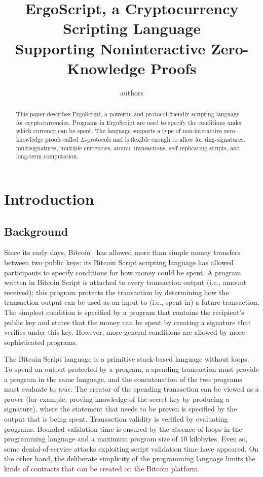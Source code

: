 \documentclass[11pt]{article}
\newcommand{\authnote}[2]{\marginpar{\parbox{\marginparwidth}{\tiny %
  \textsf{#1 {\textcolor{blue}{notes: #2}}}}}%
  \textcolor{blue}{\textbf{\dag}}}
\newcommand{\authnote}[2]{
  \textsf{#1 \textcolor{blue}{: #2}}}
\newcommand{\authnote}[2]{}
\newcommand{\lnote}[1]{{\authnote{\textcolor{orange}{Leo notes}}{#1}}}
\newcommand{\knote}[1]{{\authnote{\textcolor{green}{kushti notes}}{#1}}}
\newcommand{\langname}{ErgoScript\xspace}
\begin{document}
\title{\langname, a Cryptocurrency Scripting Language\\Supporting Noninteractive Zero-Knowledge Proofs}

\author{authors}


\maketitle


\begin{abstract}
This paper describes \langname, a powerful and protocol-friendly scripting language for cryptocurrencies. Programs in \langname are used to specify the conditions under which currency can be spent. The language supports a type of non-interactive zero-knowledge proofs called $\Sigma$-protocols and is flexible enough to allow for ring-signatures, multisignatures, multiple currencies, atomic transactions, self-replicating scripts, and long-term computation. \lnote{this list of features could use some improvement}
\end{abstract}



\section{Introduction}
\subsection{Background}

Since its early days, Bitcoin~\cite{Nak08} has allowed more than simple money transfers between two public keys: its Bitcoin Script scripting language has allowed participants to specify conditions for how money could be spent. A program written in Bitcoin Script is attached to every transaction output (i.e., amount received); this program protects the transaction by determining how the transaction output can be used as an input to (i.e., spent in) a future transaction. The simplest condition is specified by a program that contains the recipient's public key and states that the money can be spent by creating a signature that verifies under this key.  However, more general conditions are allowed by more sophisticated programs. 

The Bitcoin Script language is a primitive stack-based language without loops. \lnote{link or reference needed for bitcoin script} To spend an output protected by a program, a spending transaction must provide a program in the same language, and the concatenation of the two programs must evaluate to \emph{true}. The creator of the spending transaction can be viewed as a prover (for example, proving knowledge of the secret key by producing a signature), where the statement that needs to be proven is specified by the output that is being spent. Transaction validity is verified by evaluating programs. Bounded validation time is ensured by the absence of loops in the programming language and a maximum program size of 10 kilobytes. Even so, some denial-of-service attacks exploiting script validation time have appeared. \knote{links} On the other hand, the deliberate simplicity of the programming language limits the kinds of contracts that can be created on the Bitcoin platform.
\end{document}
